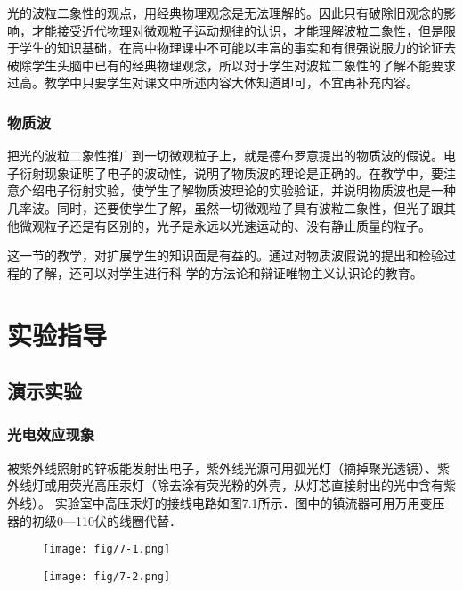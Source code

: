 光的波粒二象性的观点，用经典物理观念是无法理解的。因此只有破除旧观念的影响，才能接受近代物理对微观粒子运动规律的认识，才能理解波粒二象性，但是限于学生的知识基础，在高中物理课中不可能以丰富的事实和有很强说服力的论证去破除学生头脑中已有的经典物理观念，所以对于学生对波粒二象性的了解不能要求过高。教学中只要学生对课文中所述内容大体知道即可，不宜再补充内容。

\subsubsection{物质波}

把光的波粒二象性推广到一切微观粒子上，就是德布罗意提出的物质波的假说。电子衍射现象证明了电子的波动性，说明了物质波的理论是正确的。在教学中，要注意介绍电子衍射实验，使学生了解物质波理论的实验验证，并说明物质波也是一种几率波。同时，还要使学生了解，虽然一切微观粒子具有波粒二象性，但光子跟其他微观粒子还是有区别的，光子是永远以光速运动的、没有静止质量的粒子。

这一节的教学，对扩展学生的知识面是有益的。通过对物质波假说的提出和检验过程的了解，还可以对学生进行科
学的方法论和辩证唯物主义认识论的教育。

\section{实验指导}
\subsection{演示实验}
\subsubsection{光电效应现象}

被紫外线照射的锌板能发射出电子，紫外线光源可用弧光灯（摘掉聚光透镜）、紫外线灯或用荧光高压汞灯（除去涂有荧光粉的外壳，从灯芯直接射出的光中含有紫外线）。 实验室中高压汞灯的接线电路如图7.1所示．图中的镇流器可用万用变压器的初级0—110伏的线圈代替．
\begin{figure}[htp]\centering
    \begin{minipage}[t]{0.48\textwidth}
    \centering
    \texttt{[image: fig/7-1.png]}
    \caption{}
    \end{minipage}
    \begin{minipage}[t]{0.48\textwidth}
    \centering
    \texttt{[image: fig/7-2.png]}
    \caption{}
    \end{minipage}
    \end{figure}

